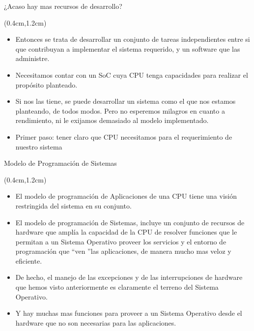 \begin{frame}{¿Acaso hay mas recursos de desarrollo?}
 \begin{textblock*}{\textwidth}(0.4cm,1.2cm)
  \begin{itemize}[<+(1)->] \justifying \parskip 0.3cm
   \item Entonces se trata de desarrollar un conjunto de tareas independientes entre si que contribuyan a implementar el sistema requerido, y un software que las administre.
   \item Necesitamos contar con un SoC cuya CPU tenga capacidades para realizar el propósito planteado.
   \item Si nos las tiene, se puede desarrollar un sistema como el que nos estamos planteando, de todos modos. Pero no esperemos milagros en cuanto a rendimiento, ni le exijamos demasiado al modelo implementado.
   \item Primer paso: tener claro que CPU necesitamos para el requerimiento de nuestro sistema
  \end{itemize}
\end{textblock*}
\end{frame}

\begin{frame}{Modelo de Programación de Sistemas}
 \begin{textblock*}{\textwidth}(0.4cm,1.2cm)
  \begin{itemize}[<+(1)->] \justifying \parskip 0.3cm
   \item El modelo de programación de Aplicaciones de una CPU tiene una visión restringida del sistema en su conjunto.
   \item El modelo de programación de Sistemas, incluye un conjunto de recursos de hardware que amplía la capacidad de la CPU de resolver funciones que le permitan a un Sistema Operativo proveer los servicios y el entorno de programación que \textquotedblleft ven \textquotedblright las aplicaciones, de manera mucho mas veloz y eficiente.
   \item De hecho, el manejo de las excepciones y de las interrupciones de hardware que hemos visto anteriormente es claramente el terreno del Sistema Operativo.
   \item Y hay muchas mas funciones para proveer a un Sistema Operativo desde el hardware que no son necesarias para las aplicaciones.
  \end{itemize}
 \end{textblock*}
\end{frame}

